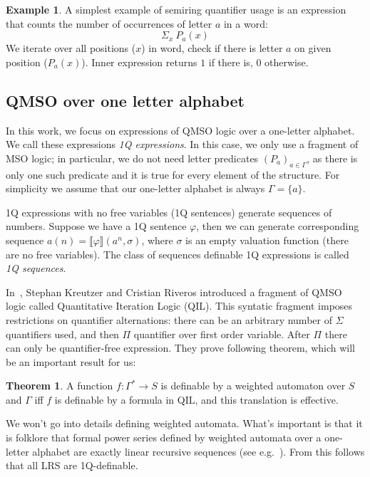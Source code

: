 \documentclass[12pt]{article}
\theoremstyle{definition}
\newtheorem{theorem}{Theorem}[section]
\newtheorem{example}{Example}[section]
\begin{document}
\begin{example}
    A simplest example of semiring quantifier usage is an expression that counts the number of occurrences of letter $a$ in a word:
    $$\Sigma_x \ P_a(x)$$
    We iterate over all positions ($x$) in word, check if there is letter $a$ on given position ($P_a(x)$). Inner expression returns $1$ if there is, $0$ otherwise. 
\end{example}

\subsection{QMSO over one letter alphabet}

In this work, we focus on expressions of QMSO logic over a one-letter alphabet. We call these expressions \emph{1Q expressions}. In this case, we only use a fragment of MSO logic; in particular, we do not need letter predicates $(P_a)_{a \in \Gamma}$, as there is only one such predicate and it is true for every element of the structure. For simplicity we assume that our one-letter alphabet is always $\Gamma = \{a\}$.

1Q expressions with no free variables (1Q sentences) generate sequences of numbers. Suppose we have a 1Q sentence $\varphi$, then we can generate corresponding sequence $a(n) = \llbracket \varphi \rrbracket (a^n, \sigma)$, where $\sigma$ is an empty valuation function (there are no free variables). The class of sequences definable 1Q expressions is called \emph{1Q sequences}.

In~\cite[Section IV]{KreutzerR13}, Stephan Kreutzer and Cristian Riveros introduced a fragment of QMSO logic called Quantitative Iteration Logic (QIL). This syntatic fragment imposes restrictions on quantifier alternations: there can be an arbitrary number of $\Sigma$ quantifiers used, and then $\Pi$ quantifier over first order variable. After $\Pi$ there can only be quantifier-free expression. They prove following theorem, which will be an important result for us:

\begin{theorem}
\label{QILWL}
    A function $f: \Gamma^* \rightarrow S$ is definable by a weighted automaton over $S$ and $\Gamma$ iff $f$ is definable by a formula in QIL, and this translation is effective.
\end{theorem}

We won't go into details defining weighted automata. What's important is that it is folklore that formal power series defined by weighted automata over a one-letter alphabet are exactly linear recursive sequences (see e.g.~\cite{BarloyFLM22}). From this follows that all LRS are 1Q-definable.
\end{document}
